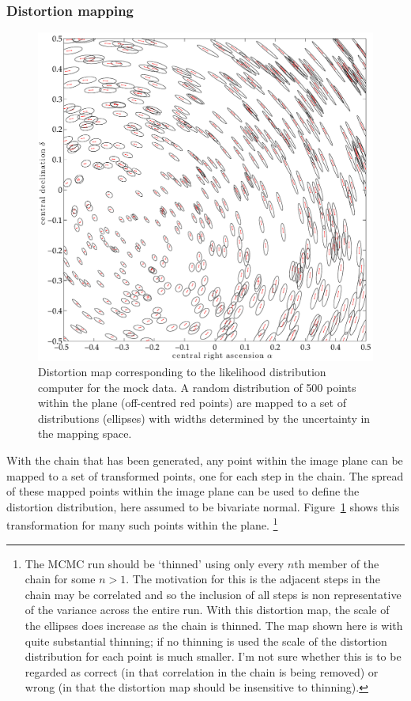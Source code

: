 \documentclass[manuscript]{aastex}
\begin{document}
\subsubsection{Distortion mapping}
\begin{figure}[h]
\centering
\includegraphics[width=\linewidth]{figures/distortion_map.pdf}
\caption{Distortion map corresponding to the likelihood distribution computer for the mock data. A random distribution of 500 points within the plane (off-centred red points) are mapped to a set of distributions (ellipses) with widths determined by the uncertainty in the mapping space.}\label{fig:map}
\end{figure}
With the chain that has been generated, any point within the image plane can be mapped to a set of transformed points, one for each step in the chain. The spread of these mapped points within the image plane can be used to define the distortion distribution, here assumed to be bivariate normal. Figure~\ref{fig:map} shows this transformation for many such points within the plane.
\footnote{The MCMC run should be `thinned' using only every $n$th member of the chain for some $n>1$. The motivation for this is the adjacent steps in the chain may be correlated and so the inclusion of all steps is non representative of the variance across the entire run. With this distortion map, the scale of the ellipses does increase as the chain is thinned. The map shown here is with quite substantial thinning; if no thinning is used the scale of the distortion distribution for each point is much smaller. I'm not sure whether this is to be regarded as correct (in that correlation in the chain is being removed) or wrong (in that the distortion map should be insensitive to thinning). }
\end{document}
